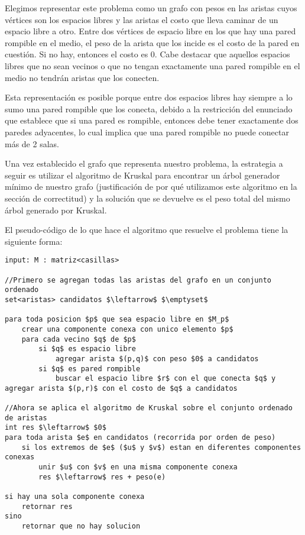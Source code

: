 Elegimos representar este problema como un grafo con pesos en las aristas cuyos vértices son los espacios libres y las aristas el costo que lleva caminar de un espacio libre a otro. Entre dos vértices de espacio libre en los que hay una pared rompible en el medio, el peso de la arista que los incide es el costo de la pared en cuestión. Si no hay, entonces el costo es $0$. Cabe destacar que aquellos espacios libres que no sean vecinos o que no tengan exactamente una pared rompible en el medio no tendrán aristas que los conecten.

Esta representación es posible porque entre dos espacios libres hay siempre a lo sumo una pared rompible que los conecta, debido a la restricción del enunciado que establece que si una pared es rompible, entonces debe tener exactamente dos paredes adyacentes, lo cual implica que una pared rompible no puede conectar más de 2 salas.

Una vez establecido el grafo que representa nuestro problema, la estrategia a seguir es utilizar el algoritmo de Kruskal para encontrar un árbol generador mínimo de nuestro grafo (justificación de por qué utilizamos este algoritmo en la sección de correctitud) y la solución que se devuelve es el peso total del mismo árbol generado por Kruskal.

El pseudo-código de lo que hace el algoritmo que resuelve el problema tiene la siguiente forma:

\begin{lstlisting}
input: M : matriz<casillas>

//Primero se agregan todas las aristas del grafo en un conjunto ordenado
set<aristas> candidatos $\leftarrow$ $\emptyset$

para toda posicion $p$ que sea espacio libre en $M_p$
	crear una componente conexa con unico elemento $p$
	para cada vecino $q$ de $p$
		si $q$ es espacio libre
			agregar arista $(p,q)$ con peso $0$ a candidatos
		si $q$ es pared rompible
			buscar el espacio libre $r$ con el que conecta $q$ y agregar arista $(p,r)$ con el costo de $q$ a candidatos

//Ahora se aplica el algoritmo de Kruskal sobre el conjunto ordenado de aristas
int res $\leftarrow$ $0$
para toda arista $e$ en candidatos (recorrida por orden de peso)
	si los extremos de $e$ ($u$ y $v$) estan en diferentes componentes conexas
		unir $u$ con $v$ en una misma componente conexa
		res $\leftarrow$ res + peso(e)

si hay una sola componente conexa
	retornar res
sino
	retornar que no hay solucion
\end{lstlisting}

